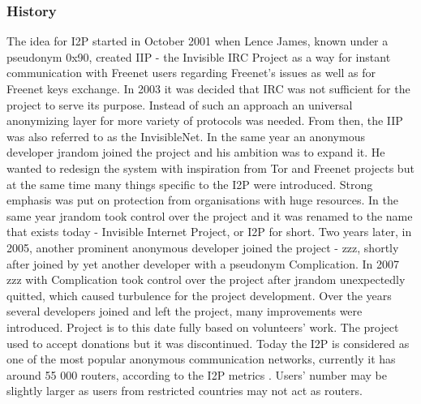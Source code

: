 \subsubsection{History}
The idea for I2P started in October 2001 when Lence James, known under a pseudonym 0x90, created IIP - the Invisible IRC Project as a way for instant communication with Freenet users regarding Freenet’s issues as well as for Freenet keys exchange.
In 2003 it was decided that IRC was not sufficient for the project to serve its purpose. Instead of such an approach an universal anonymizing layer for more variety of protocols was needed. From then, the IIP was also referred to as the InvisibleNet. 
In the same year an anonymous developer jrandom joined the project and his ambition was to expand it. He wanted to redesign the system with inspiration from Tor and Freenet projects but at the same time many things specific to the I2P were introduced. Strong emphasis was put on protection from organisations with huge resources. In the same year jrandom took control over the project and it was renamed to the name that exists today - Invisible Internet Project, or I2P for short. Two years later, in 2005, another prominent anonymous developer joined the project - zzz, shortly after joined by yet another developer with a pseudonym Complication. In 2007 zzz with Complication took control over the project after jrandom unexpectedly quitted, which caused turbulence for the project development.
Over the years several developers joined and left the project, many improvements were introduced. Project is to this date fully based on volunteers’ work. The project used to accept donations but it was discontinued. Today the I2P is considered as one of the most popular anonymous communication networks, currently it has around 55 000 routers, according to the I2P metrics \cite{i2pmetrics, i2pmetrics2}. Users’ number may be slightly larger as users from restricted countries may not act as routers.

